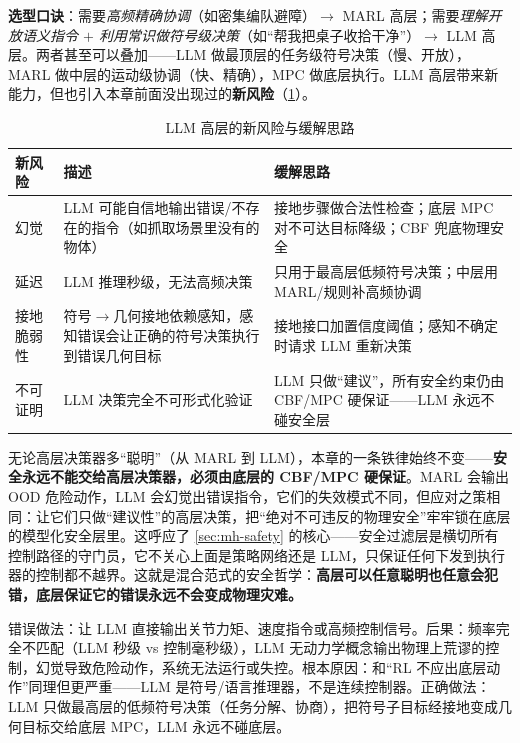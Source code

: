 \noindent\textbf{选型口诀}：需要\emph{高频精确协调}（如密集编队避障）$\to$ MARL 高层；需要\emph{理解开放语义指令 $+$ 利用常识做符号级决策}（如“帮我把桌子收拾干净”）$\to$ LLM 高层。两者甚至可以叠加——LLM 做最顶层的任务级符号决策（慢、开放），MARL 做中层的运动级协调（快、精确），MPC 做底层执行。LLM 高层带来新能力，但也引入本章前面没出现过的\textbf{新风险}（\cref{tab:mh-llm-risk}）。

\begin{table}[H]\centering\small
\caption{LLM 高层的新风险与缓解思路}
\label{tab:mh-llm-risk}
\begin{tabular}{p{2.6cm}p{4.4cm}p{4.6cm}}
\toprule
新风险 & 描述 & 缓解思路 \\
\midrule
幻觉 & LLM 可能自信地输出错误/不存在的指令（如抓取场景里没有的物体） & 接地步骤做合法性检查；底层 MPC 对不可达目标降级；CBF 兜底物理安全 \\
延迟 & LLM 推理秒级，无法高频决策 & 只用于最高层低频符号决策；中层用 MARL/规则补高频协调 \\
接地脆弱性 & 符号$\to$几何接地依赖感知，感知错误会让正确的符号决策执行到错误几何目标 & 接地接口加置信度阈值；感知不确定时请求 LLM 重新决策 \\
不可证明 & LLM 决策完全不可形式化验证 & LLM 只做“建议”，所有安全约束仍由 CBF/MPC 硬保证——LLM 永远不碰安全层 \\
\bottomrule
\end{tabular}
\end{table}

\begin{insight}
无论高层决策器多“聪明”（从 MARL 到 LLM），本章的一条铁律始终不变——\textbf{安全永远不能交给高层决策器，必须由底层的 CBF/MPC 硬保证}。MARL 会输出 OOD 危险动作，LLM 会幻觉出错误指令，它们的失效模式不同，但应对之策相同：让它们只做“建议性”的高层决策，把“绝对不可违反的物理安全”牢牢锁在底层的模型化安全层里。这呼应了 \cref{sec:mh-safety} 的核心——安全过滤层是横切所有控制路径的守门员，它不关心上面是策略网络还是 LLM，只保证任何下发到执行器的控制都不越界。这就是混合范式的安全哲学：\textbf{高层可以任意聪明也任意会犯错，底层保证它的错误永远不会变成物理灾难。}
\end{insight}

\begin{pitfall}
错误做法：让 LLM 直接输出关节力矩、速度指令或高频控制信号。后果：频率完全不匹配（LLM 秒级 vs 控制毫秒级），LLM 无动力学概念输出物理上荒谬的控制，幻觉导致危险动作，系统无法运行或失控。根本原因：和“RL 不应出底层动作”同理但更严重——LLM 是符号/语言推理器，不是连续控制器。正确做法：LLM 只做最高层的低频符号决策（任务分解、协商），把符号子目标经接地变成几何目标交给底层 MPC，LLM 永远不碰底层。
\end{pitfall}

